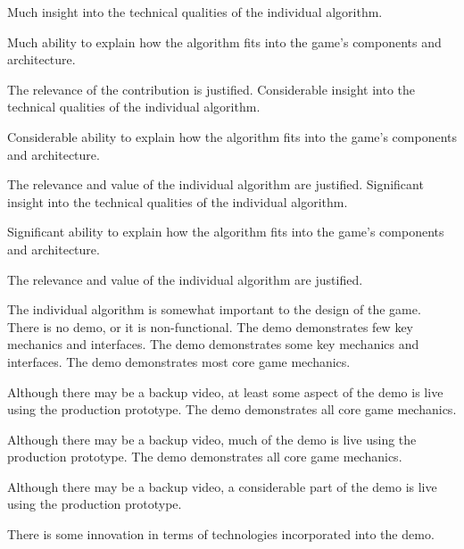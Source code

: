 \documentclass{../../fal_assignment}
\begin{document}
\begin{markingrubric}
        \grade Much insight into the technical qualities of the individual algorithm.
            \par Much ability to explain how the algorithm fits into the game's components and architecture.
            \par The relevance of the contribution is justified.
        \grade Considerable insight into the technical qualities of the individual algorithm.
            \par Considerable ability to explain how the algorithm fits into the game's components and architecture.
            \par The relevance and value of the individual algorithm are justified.
        \grade Significant insight into the technical qualities of the individual algorithm.
            \par Significant ability to explain how the algorithm fits into the game's components and architecture.
            \par The relevance and value of the  individual algorithm are justified.
            \par The  individual algorithm is somewhat important to the design of the game.
%
        \grade\fail There is no demo, or it is non-functional.
        \grade The demo demonstrates few key mechanics and interfaces.
        \grade The demo demonstrates some key mechanics and interfaces.
        \grade The demo demonstrates most core game mechanics.
            \par Although there may be a backup video, at least some aspect of the demo is live using the production prototype.
        \grade The demo demonstrates all core game mechanics.
            \par Although there may be a backup video, much of the demo is live using the production prototype.
        \grade The demo demonstrates all core game mechanics.
            \par Although there may be a backup video, a considerable part of the demo is live using the production prototype.
            \par There is some innovation in terms of technologies incorporated into the demo.
\end{markingrubric}
\end{document}
